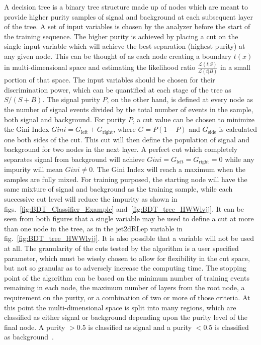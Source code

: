 A decision tree is a binary tree structure made up of nodes which are meant to provide higher purity samples of signal and background at each subsequent layer of the tree.
A set of input variables is chosen by the analyzer before the start of the training sequence.
The higher purity is achieved by placing a cut on the single input variable which will achieve the best separation (highest purity) at any given node.
This can be thought of as each node creating a boundary $t\left(x\right)$ in multi-dimensional space and estimating the likelihood ratio $\frac{\mathcal{L}\left(t|S\right)}{\mathcal{L}\left(t|B\right)}$ in a small portion of that space.
The input variables should be chosen for their discrimination power, which can be quantified at each stage of the tree as $S/\left(S+B\right)$.
The signal purity $P$, on the other hand, is defined at every node as the number of signal events divided by the total number of events in the sample, both signal and background.
For purity $P$, a cut value can be chosen to minimize the Gini Index $Gini=G_{\text{left}}+G_{\text{right}}$, where $G=P\left(1-P\right)$ and $G_{\text{side}}$ is calculated one both sides of the cut.
This cut will then define the population of signal and background for two nodes in the next layer.
A perfect cut which completely separates signal from background will achieve $Gini=G_{\text{left}}=G_{\text{right}}=0$ while any impurity will mean $Gini\neq0$.
The Gini Index will reach a maximum when the samples are fully mixed.
For training purposed, the starting node will have the same mixture of signal and background as the training sample, while each successive cut level will reduce the impurity as shown in figs.~\ref{fig:BDT_Classifier_Example} and~\ref{fig:BDT_tree_HWWlvjj}.
It can be seen from both figures that a single variable may be used to define a cut at more than one node in the tree, as in the jet2dRLep variable in fig.~\ref{fig:BDT_tree_HWWlvjj}.
It is also possible that a variable will not be used at all.
The granularity of the cuts tested by the algorithm is a user specified parameter, which must be wisely chosen to allow for flexibility in the cut space, but not so granular as to adversely increase the computing time.
The stopping point of the algorithm can be based on the minimum number of training events remaining in each node, the maximum number of layers from the root node, a requirement on the purity, or a combination of two or more of those criteria.
At this point the multi-dimensional space is split into many regions, which are classified as either signal or background depending upon the purity level of the final node.
A purity $>0.5$ is classified as signal and a purity $<0.5$ is classified as background~\cite{1742-6596-219-3-032057}.

